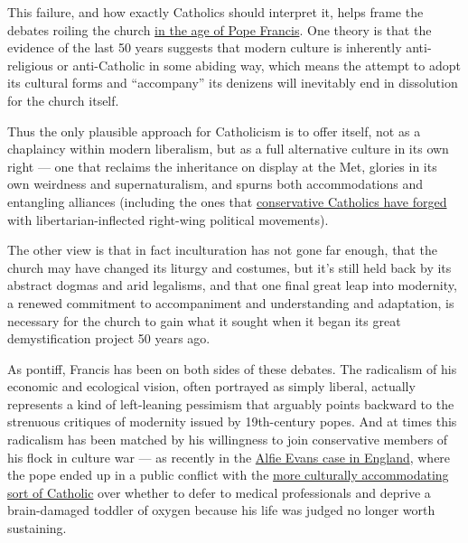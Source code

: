 This failure, and how exactly Catholics should interpret it, helps frame
the debates roiling the church
\href{http://www.simonandschuster.com/books/To-Change-the-Church/Ross-Douthat/9781501146923}{in
the age of Pope Francis}. One theory is that the evidence of the last 50
years suggests that modern culture is inherently anti-religious or
anti-Catholic in some abiding way, which means the attempt to adopt its
cultural forms and ``accompany'' its denizens will inevitably end in
dissolution for the church itself.

Thus the only plausible approach for Catholicism is to offer itself, not
as a chaplaincy within modern liberalism, but as a full alternative
culture in its own right --- one that reclaims the inheritance on
display at the Met, glories in its own weirdness and supernaturalism,
and spurns both accommodations and entangling alliances (including the
ones that
\href{http://theweek.com/articles/771381/what-catholics-have-sacrificed-by-allying-republican-evangelicals}{conservative
Catholics have forged} with libertarian-inflected right-wing political
movements).

The other view is that in fact inculturation has not gone far enough,
that the church may have changed its liturgy and costumes, but it's
still held back by its abstract dogmas and arid legalisms, and that one
final great leap into modernity, a renewed commitment to accompaniment
and understanding and adaptation, is necessary for the church to gain
what it sought when it began its great demystification project 50 years
ago.

As pontiff, Francis has been on both sides of these debates. The
radicalism of his economic and ecological vision, often portrayed as
simply liberal, actually represents a kind of left-leaning pessimism
that arguably points backward to the strenuous critiques of modernity
issued by 19th-century popes. And at times this radicalism has been
matched by his willingness to join conservative members of his flock in
culture war --- as recently in the
\href{https://www.nytimes3xbfgragh.onion/2018/04/28/opinion/sunday/alfie-evans-and-the-experts.html}{Alfie
Evans case in England}, where the pope ended up in a public conflict
with the
\href{https://www.nationalreview.com/2018/05/alfie-evans-catholic-teaching-supports-wishes-of-parents/}{more
culturally accommodating sort of Catholic} over whether to defer to
medical professionals and deprive a brain-damaged toddler of oxygen
because his life was judged no longer worth sustaining.

